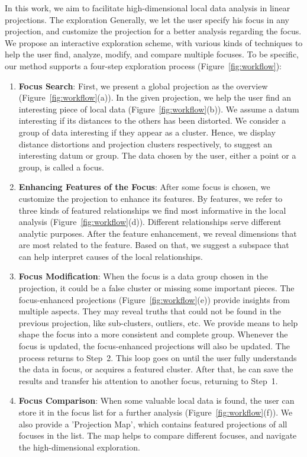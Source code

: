 In this work, we aim to facilitate high-dimensional local data analysis in linear projections. The exploration Generally, we let the user specify his focus in any projection, and customize the projection for a better analysis regarding the focus. We propose an interactive exploration scheme, with various kinds of techniques to help the user find, analyze, modify, and compare multiple focuses. To be specific, our method supports a four-step exploration process (Figure~\ref{fig:workflow}):
\begin{enumerate}[Step. 1:]
 \item \textbf{Focus Search}: First, we present a global projection as the overview (Figure~\ref{fig:workflow}(a)). In the given projection, we help the user find an interesting piece of local data (Figure~\ref{fig:workflow}(b)). We assume a datum interesting if its distances to the others has been distorted. We consider a group of data interesting if they appear as a cluster. Hence, we display distance distortions and projection clusters respectively, to suggest an interesting datum or group. The data chosen by the user, either a point or a group, is called a focus.
 \item \textbf{Enhancing Features of the Focus}: After some focus is chosen, we customize the projection to enhance its features. By features, we refer to three kinds of featured relationships we find most informative in the local analysis (Figure~\ref{fig:workflow}(d)). Different relationships serve different analytic purposes. After the feature enhancement, we reveal dimensions that are most related to the feature. Based on that, we suggest a subspace that can help interpret causes of the local relationships.
 \item \textbf{Focus Modification}: When the focus is a data group chosen in the projection, it could be a false cluster or missing some important pieces. The focus-enhanced projections (Figure~\ref{fig:workflow}(e)) provide insights from multiple aspects. They may reveal truths that could not be found in the previous projection, like sub-clusters, outliers, etc. We provide means to help shape the focus into a more consistent and complete group. Whenever the focus is updated, the focus-enhanced projections will also be updated. The process returns to Step~2. This loop goes on until the user fully understands the data in focus, or acquires a featured cluster. After that, he can save the results and transfer his attention to another focus, returning to Step~1.
 \item \textbf{Focus Comparison}: When some valuable local data is found, the user can store it in the focus list for a further analysis (Figure~\ref{fig:workflow}(f)). We also provide a 'Projection Map', which contains featured projections of all focuses in the list. The map helps to compare different focuses, and navigate the high-dimensional exploration.
\end{enumerate}
